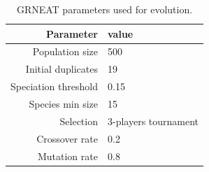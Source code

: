 \begin{table}
\center
\begin{tabular}{rl}
Parameter			& value 					\\\hline
Population size		& 500					\\
Initial duplicates		& 19					\\
Speciation threshold 	& 0.15					\\
Species min size		& 15					\\
Selection				& 3-players tournament	\\
Crossover rate		& 0.2					\\
Mutation rate			& 0.8					\\
\end{tabular}
\caption{GRNEAT parameters used for evolution.}\label{tab:GREAT:params}
\end{table}



